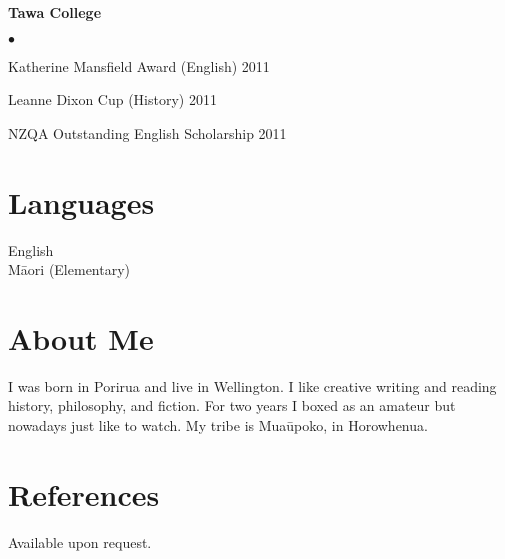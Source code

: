 \documentclass[margin,line]{res}
\newenvironment{list2}{
  \begin{list}{$\bullet$}{%
      \setlength{\itemsep}{0in}
      \setlength{\parsep}{0in} \setlength{\parskip}{0in}
      \setlength{\topsep}{0in} \setlength{\partopsep}{0in}
      \setlength{\leftmargin}{0.2in}}}
  {\end{list}}
\begin{document}
\begin{resume}
{\bf Tawa College}
\begin{list2}
	\item Katherine Mansfield Award (English) \hfill 2011
	\item Leanne Dixon Cup (History) \hfill 2011
	\item NZQA Outstanding English Scholarship \hfill 2011
\end{list2}

\section{\sc Languages}
English\\
M\=aori (Elementary)

\section{\sc About Me}
I was born in Porirua and live in Wellington. I like creative writing and reading history, philosophy, and fiction. For two years I boxed as an amateur but nowadays just like to watch. My tribe is Mua\=upoko, in Horowhenua.

\section{\sc References}
Available upon request.

\end{resume}
\end{document}
